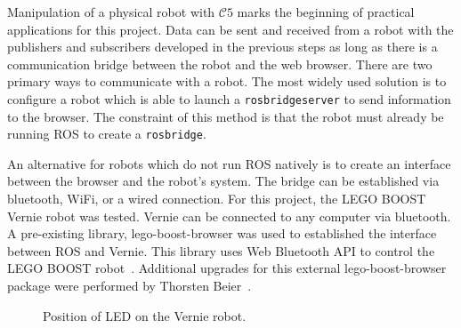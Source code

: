         Manipulation of a physical robot with $\mathcal{C}5$ marks the beginning of practical applications for this project. Data can be sent and received from a robot with the publishers and subscribers developed in the previous steps as long as there is a communication bridge between the robot and the web browser. There are two primary ways to communicate with a robot. The most widely used solution is to configure a robot which is able to launch a \texttt{rosbridge\smallunderscore server} to send information to the browser. The constraint of this method is that the robot must already be running \ac{ROS} to create a \texttt{rosbridge}.

        An alternative for robots which do not run \ac{ROS} natively is to create an interface between the browser and the robot's system. The bridge can be established via bluetooth, WiFi, or a wired connection. For this project, the LEGO BOOST Vernie robot was tested. Vernie can be connected to any computer via bluetooth. A pre-existing library, \textsf{lego-boost-browser} was used to established the interface between \ac{ROS} and Vernie. This library uses Web Bluetooth \ac{API} to control the LEGO BOOST robot~\cite{boosted}.  Additional upgrades for this external \textsf{lego-boost-browser} package were performed by Thorsten Beier~\cite{thoboost}.

        
        \begin{figure}[htbp]
            \centering
    
            \caption{Position of \ac{LED} on the Vernie robot.}
            \label{fig:vernie}
        \end{figure}

